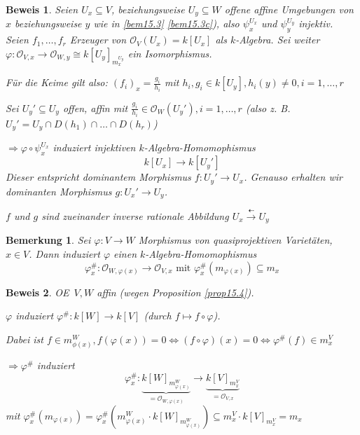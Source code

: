 \documentclass[a4paper, 12pt, numbers=noendperiod, chapterprefix=true]{scrbook}
\theoremstyle{break}
\newtheorem{Bem}[Def]{Bemerkung}
\theoremstyle{nonumberbreak}
\newtheorem{Bew}{Beweis}
\theoremstyle{nonumberplain}
\newcommand{\calO}{\mathcal{O}}
\renewcommand{\OE}{O\!\!E~}
\begin{document}
\begin{Bew}
Seien $U_x\subseteq V$, beziehungsweise $U_y\subseteq W$ offene affine Umgebungen von $x$ beziehungsweise $y$ wie in \ref{bem15.3} \ref{bem15.3c}), also $\psi_x^{U_x}$ und $\psi_y^{U_y}$ injektiv. Seien $f_1,\ldots ,f_r$ Erzeuger von $\calO_V(U_x)=k[U_x]$ als $k$-Algebra. Sei weiter $\varphi:\calO_{V,x}\to\calO_{W,y}\cong k[U_y]_{m_x^{U_y}}$ ein Isomorphismus.

F\"ur die Keime gilt also: $(f_i)_x=\frac{g_i}{h_i}$ mit $h_i, g_i \in k[U_y], h_i(y)\ne 0, i=1,\ldots ,r$

Sei $U_y' \subseteq U_y$ offen, affin mit $\frac{g_i}{h_i}\in\calO_W(U_y'), i=1,\ldots ,r$ (also z. B. $U_y'=U_y\cap D(h_1)\cap\ldots \cap D(h_r)$)

$\Rightarrow \varphi\circ\psi_x^{U_x}$ induziert injektiven $k$-Algebra-Homomophismus
	\[k[U_x]\to k[U_y']\]
Dieser entspricht dominantem Morphismus $f:U_y'\to U_x$. Genauso erhalten wir dominanten Morphismus $g:U_x'\to U_y$.

$f$ und $g$ sind zueinander inverse rationale Abbildung $U_x \overset{\dashleftarrow}{\to} U_y$ %
\end{Bew}

\begin{Bem}
Sei $\varphi: V\to W$ Morphismus von quasiprojektiven Variet\"aten, $x\in V$. Dann induziert $\varphi$ einen $k$-Algebra-Homomophismus
	\[\varphi_x^{\#}:\calO_{W,\varphi(x)}\to\calO_{V,x} \text{ mit } \varphi_x^{\#}(m_{\varphi(x)})\subseteq m_x\]
\end{Bem}

\begin{Bew}
\OE $V,W$ affin (wegen Proposition \ref{prop15.4}).

$\varphi$ induziert $\varphi^\#:k[W]\to k[V]$ (durch $f\mapsto f\circ\varphi$).

Dabei ist $f\in m_{\phi(x)}^W, f(\varphi(x))=0 \Leftrightarrow (f\circ\varphi)(x)=0 \Leftrightarrow \varphi^\#(f)\in m_x^V$

$\Rightarrow \varphi^\#$ induziert
	\[ \varphi_x^\#: \underbrace{k[W]_{m_{\varphi(x)}^W}}_{=\calO_{W,\varphi(x)}} \to \underbrace{k[V]_{m_x^V}}_{=\calO_{V,x}}\]
mit $\varphi_x^\#(m_{\varphi(x)}) = \varphi_x^\#(m_{\varphi(x)}^W \cdot k[W]_{m_{\varphi(x)}^W}) \subseteq m_x^V \cdot k[V]_{m_x^V} = m_x$
\end{Bew}

\newpage

\end{document}
